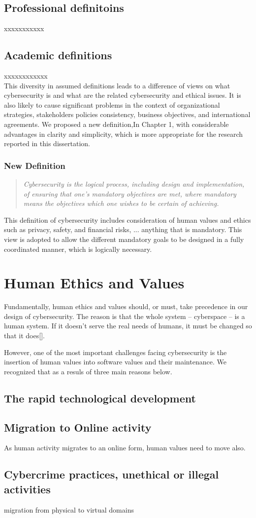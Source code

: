 \subsection{Professional definitoins}
xxxxxxxxxxx
\subsection{Academic definitions}
xxxxxxxxxxxx
\\

This diversity in assumed definitions leads to a difference of views on what cybersecurity is and what are the related cybersecurity and ethical issues. It is also likely to cause significant problems in the context of organizational strategies, stakeholders policies consistency, business objectives, and international agreements. We proposed a new definition,In Chapter 1, with considerable advantages in clarity and simplicity, 
which is more appropriate for the research reported in this dissertation.

\subsubsection*{New Definition}
\begin{quote} \em Cybersecurity is the logical process, including design and implementation, of ensuring that one's mandatory objectives are met, where mandatory means the objectives which one wishes to be certain of achieving.\end{quote}

This definition of cybersecurity includes consideration of human values and ethics such as privacy, safety, and financial risks, ... anything that is mandatory. This view is adopted to allow the different mandatory goals
to be designed in a fully coordinated manner, which is logically necessary.

\section{Human Ethics and Values}
Fundamentally, human ethics and values should, or must, take precedence in our design of cybersecurity. The reason is that the whole system -- cyberspace -- is a human system. If it doesn't serve the real needs of humans, it must be changed so that it does[]. 

However, one of the most important challenges facing cybersecurity is the insertion of human values into software values and their maintenance.  We recognized  that as a resuls of three  main reasons below. 
\subsection {The rapid technological development}

\subsection  {Migration to Online activity}

As human activity migrates to an online form, human values need to move also.
 
\subsection {Cybercrime practices, unethical or illegal activities}

migration from physical to virtual domains



